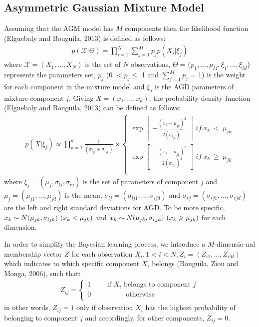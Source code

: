 \documentclass[conference]{llncs}
\begin{document}
\subsection{Asymmetric Gaussian Mixture Model}
Assuming that the AGM model has $M$ components then the likelihood function (Elguebaly and Bouguila, 2013)\cite{Elguebaly2014} is defined as follows:
\begin{align}
p(\mathcal{X}|\Theta) = \prod_{i=1}^N \sum_{j=1}^Mp_jp(X_i|\xi_j)
\label{eq:1}
\end{align}
where $\mathcal{X} = (X_1,...,X_N)$ is the set of $N$ observations, $\Theta = \{p_1,...,p_M, \xi_1,...,\xi_M\}$ represents the parameters set, $p_j$ (0 $< p_j \leq$ 1 and $\sum_{j=1}^Mp_j$ = 1) is the weight for each component in the mixture model and $\xi_j$ is the AGD parameters of mixture component $j$. Giving $X = (x_1,...,x_d)$, the probability density function (Elguebaly and Bouguila, 2013)\cite{Elguebaly2014} can be defined as follows:
\begin{align}
p(X|\xi_j) \propto \prod_{k=1}^{d} \frac{1}{(\sigma_{l_{jk}}+\sigma_{r_{jk}})}
\times \left\{\begin{matrix}
\exp \begin{bmatrix}
-\frac{(x_k-\mu_{jk})^2}{2(\sigma_{l_{jk}})^2}
\end{bmatrix}\ if\ x_k\ <\ \mu_{jk} \\ 
\exp \begin{bmatrix}
-\frac{(x_k-\mu_{jk})^2}{2(\sigma_{r_{jk}})^2}
\end{bmatrix}\ if\ x_k\ \geqslant\ \mu_{jk} \\ 
\end{matrix}\right.
\label{eq:2}
\end{align}
where $\xi_j = (\mu_j,\sigma_{lj},\sigma_{rj})$ is the set of parameters of component $j$ and $\mu_j = (\mu_{j1},...,\mu_{jd})$ is the mean, $\sigma_{lj} = (\sigma_{lj1},...,\sigma_{ljd})$ and $\sigma_{rj} = (\sigma_{rj1},...,\sigma_{rjd})$ are the left and right standard deviations for AGD. To be more specific, $x_k \thicksim N(\mu_{jk},\sigma_{ljk})\ (x_k < \mu_{jk})$ and $x_k \thicksim N(\mu_{jk},\sigma_{rjk})\ (x_k \geqslant \mu_{jk})$ for each dimension.

In order to simplify the Bayesian learning process, we introduce a $M$-dimensio-nal membership vector $Z$ for each observation $X_i, 1 < i <N, Z_i = (Z_{i1},...,Z_{iM})$ which indicates to which specific component $X_i$ belongs (Bouguila, Ziou and Monga, 2006)\cite{Bouguila2006}, such that:
\begin{align}
Z_{ij} = \left\{\begin{matrix}
1\qquad\mbox{ if }X_i\mbox{  belongs to component }j \\
0\qquad\quad\qquad \mbox{otherwise} \qquad\qquad\quad\quad \\
\end{matrix}\right.
\label{eq:3}
\end{align}
in other words, $Z_{ij} = 1$ only if observation $X_i$ has the highest probability of belonging to component $j$ and accordingly, for other components, $Z_{ij} = 0$. 
\end{document}
